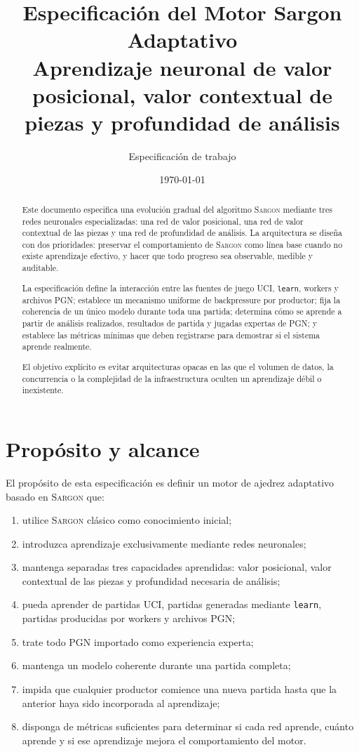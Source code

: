 \documentclass[11pt,a4paper]{article}
\title{\textbf{Especificación del Motor Sargon Adaptativo}\\Aprendizaje neuronal de valor posicional, valor contextual de piezas y profundidad de análisis}
\author{Especificación de trabajo}
\date{\today}
\newcommand{\Sargon}{\textsc{Sargon}}
\begin{document}
\maketitle
\begin{abstract}
Este documento especifica una evolución gradual del algoritmo \Sargon{} mediante tres redes neuronales especializadas: una red de valor posicional, una red de valor contextual de las piezas y una red de profundidad de análisis. La arquitectura se diseña con dos prioridades: preservar el comportamiento de \Sargon{} como línea base cuando no existe aprendizaje efectivo, y hacer que todo progreso sea observable, medible y auditable.

La especificación define la interacción entre las fuentes de juego UCI, \texttt{learn}, workers y archivos PGN; establece un mecanismo uniforme de backpressure por productor; fija la coherencia de un único modelo durante toda una partida; determina cómo se aprende a partir de análisis realizados, resultados de partida y jugadas expertas de PGN; y establece las métricas mínimas que deben registrarse para demostrar si el sistema aprende realmente.

El objetivo explícito es evitar arquitecturas opacas en las que el volumen de datos, la concurrencia o la complejidad de la infraestructura oculten un aprendizaje débil o inexistente.
\end{abstract}
\tableofcontents
\newpage

\section{Propósito y alcance}
El propósito de esta especificación es definir un motor de ajedrez adaptativo basado en \Sargon{} que:
\begin{enumerate}
\item utilice \Sargon{} clásico como conocimiento inicial;
\item introduzca aprendizaje exclusivamente mediante redes neuronales;
\item mantenga separadas tres capacidades aprendidas: valor posicional, valor contextual de las piezas y profundidad necesaria de análisis;
\item pueda aprender de partidas UCI, partidas generadas mediante \texttt{learn}, partidas producidas por workers y archivos PGN;
\item trate todo PGN importado como experiencia experta;
\item mantenga un modelo coherente durante una partida completa;
\item impida que cualquier productor comience una nueva partida hasta que la anterior haya sido incorporada al aprendizaje;
\item disponga de métricas suficientes para determinar si cada red aprende, cuánto aprende y si ese aprendizaje mejora el comportamiento del motor.
\end{enumerate}
\end{document}
